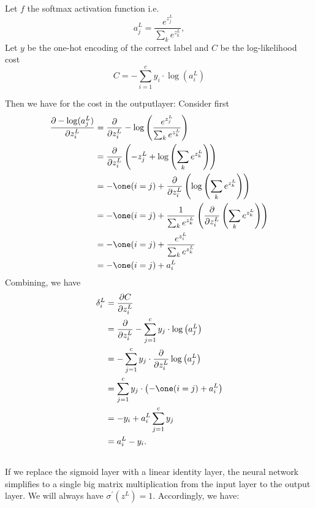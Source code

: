 \documentclass{article}
\begin{document}
\subsection{}
Let $f$ the softmax activation function i.e.
$$a_j^L=\frac{e^{z_j^L}}{\sum_k e^{z_k^L}}, $$
Let $y$ be the one-hot encoding of the correct label and $C$ be the log-likelihood cost
$$
C=-\sum_{i=1}^c y_i \cdot \log \left(a_i^L \right) 
$$



Then we have for the cost in the outputlayer:
Consider first
$$
\begin{aligned}
	\frac{\partial -\log(a_j^L)}{\partial z_i^L} 
	&=\frac{\partial}{\partial z_i^L} -\log \left(\frac{e^{z_j^L}}{\sum_k e^{z_k^L}}\right)
	\\&=\frac{\partial}{\partial z_i^L} \left(-z_j^L+\log \left(\sum_k e^{z_k^L}\right)\right)
	\\&=-\one(i=j)+\frac{\partial}{\partial z_i^L} \left(\log \left(\sum_k e^{z_k^L}\right)\right)
	\\&=-\one(i=j)+\frac{1}{\sum_k e^{z_k^L}} \left(\frac{\partial}{\partial z_i^L} \left(\sum_k e^{z_k^L}\right)\right)
	\\&=-\one(i=j)+\frac{e^{z_i^L}}{\sum_k e^{z_k^L}} 
	\\&=-\one(i=j)+a_i^L
		\end{aligned}
$$
Combining, we have
$$
\begin{aligned}
	\delta^L_i&=\frac{\partial C}{\partial z_i^L} 
	\\&= \frac{\partial }{\partial z_i^L} -\sum_{j=1}^c y_j \cdot \log \left(a_j^L \right)
	\\&=  -\sum_{j=1}^c y_j \cdot \frac{\partial }{\partial z_i^L} \log \left(a_j^L \right)
	\\&=  \sum_{j=1}^c y_j \cdot \left(-\one(i=j)+a_i^L\right)
	\\&=  -y_i+a_i^L \sum_{j=1}^c y_j
	\\&=  a_i^L-y_i.
			\end{aligned}
$$



\subsection{}
If we replace the sigmoid layer with a linear identity layer, the neural network simplifies to a single big matrix multiplication from the input layer to the output layer. We will always have $\sigma^{\prime}\left(z^L\right)=1$. Accordingly, we have:
\end{document}
